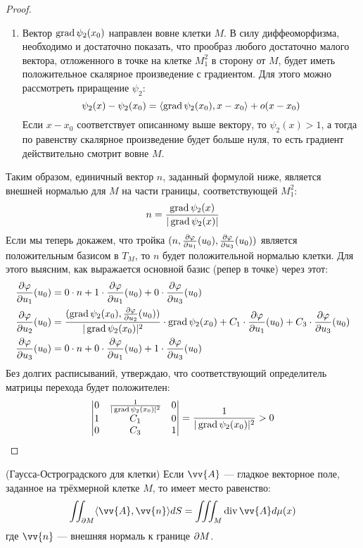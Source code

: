 \begin{proof}
\begin{enumerate}
		\item Вектор $\operatorname{grad} \psi_2(x_0)$ направлен вовне клетки $M$. В силу диффеоморфизма, необходимо и достаточно показать, что прообраз любого достаточно малого вектора, отложенного в точке на клетке $M_1^2$ в сторону от $M$, будет иметь положительное скалярное произведение с градиентом. Для этого можно рассмотреть приращение $\psi_2$:
		\[
			\psi_2(x) - \psi_2(x_0) = \left\langle\operatorname{grad} \psi_2(x_0), x - x_0\right\rangle + o(x - x_0)
 		\]
 		Если $x - x_0$ соответствует описанному выше вектору, то $\psi_2(x) > 1$, а тогда по равенству скалярное произведение будет больше нуля, то есть градиент действительно смотрит вовне $M$.
	\end{enumerate}
	Таким образом, единичный вектор $n$, заданный формулой ниже, является внешней нормалью для $M$ на части границы, соответствующей $M_1^2$:
	\[
		n = \frac{\operatorname{grad} \psi_2(x)}{|\operatorname{grad} \psi_2(x)|}
	\]
	Если мы теперь докажем, что тройка $(n, \frac{\partial \varphi}{\partial u_1}(u_0), \frac{\partial \varphi}{\partial u_3}(u_0))$ является положительным базисом в $T_M$, то $n$ будет положительной нормалью клетки. Для этого выясним, как выражается основной базис (репер в точке) через этот:
	\begin{align*}
		&{\frac{\partial \varphi}{\partial u_1}(u_0) = 0 \cdot n + 1 \cdot \frac{\partial \varphi}{\partial u_1}(u_0) + 0 \cdot \frac{\partial \varphi}{\partial u_3}(u_0)}
		\\
		&{\frac{\partial \varphi}{\partial u_2}(u_0) = \frac{(\operatorname{grad} \psi_2(x_0), \frac{\partial \varphi}{\partial u_2}(u_0))}{|\operatorname{grad} \psi_2(x_0)|^2} \cdot \operatorname{grad} \psi_2(x_0)} + C_1 \cdot \frac{\partial \varphi}{\partial u_1}(u_0) + C_3 \cdot \frac{\partial \varphi}{\partial u_3}(u_0)
		\\
		&{\frac{\partial \varphi}{\partial u_3}(u_0) = 0 \cdot n + 0 \cdot \frac{\partial \varphi}{\partial u_1}(u_0) + 1 \cdot \frac{\partial \varphi}{\partial u_3}(u_0)}
	\end{align*}
	Без долгих расписываний, утверждаю, что соответствующий определитель матрицы перехода будет положителен:
	\[
		\begin{vmatrix}
			0 & \frac{1}{|\operatorname{grad} \psi_2(x_0)|^2} & 0
			\\
			1 & C_1 & 0
			\\
			0 & C_3 & 1
		\end{vmatrix} = \frac{1}{|\operatorname{grad} \psi_2(x_0)|^2} > 0
	\]
\end{proof}

\begin{theorem} (Гаусса-Остроградского для клетки)
	Если $\vv{A}$ --- гладкое векторное поле, заданное на трёхмерной клетке $M$, то имеет место равенство:
	\[
		\iint_{\vdelta M} \ntbr{\vv{A}, \vv{n}}dS = \iiint_M \Div \vv{A} d\mu(x)
	\]
	где $\vv{n}$ --- внешняя нормаль к границе $\partial M$.
\end{theorem}


